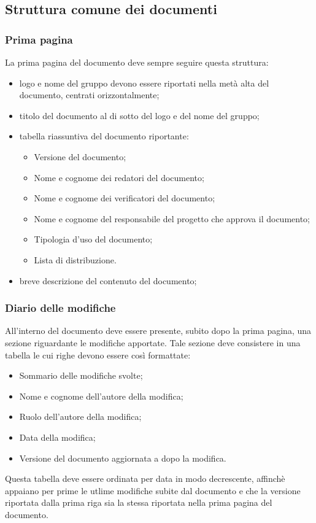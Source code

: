   \subsection{Struttura comune dei documenti}
  \subsubsection{Prima pagina}
  La prima pagina del documento deve sempre seguire questa struttura:
  \begin{itemize}
    \item logo e nome del gruppo devono essere riportati nella metà alta del documento, centrati orizzontalmente;
    \item titolo del documento al di sotto del logo e del nome del gruppo;
    \item tabella riassuntiva del documento riportante:
      \begin{itemize}
      \item Versione del documento;
      \item Nome e cognome dei redatori del documento;
      \item Nome e cognome dei verificatori del documento;
      \item Nome e cognome del responsabile del progetto che approva il documento;
      \item Tipologia d'uso del documento;
      \item Lista di distribuzione.
      \end{itemize}
    \item breve descrizione del contenuto del documento;
  \end{itemize}

  \subsubsection{Diario delle modifiche}
  All'interno del documento deve essere presente, subito dopo la prima pagina, una sezione riguardante le modifiche apportate. Tale sezione deve consistere in una tabella le cui righe devono essere cos\`i formattate:
  \begin{itemize}
  \item Sommario delle modifiche svolte;
  \item Nome e cognome dell'autore della modifica;
  \item Ruolo dell'autore della modifica;
  \item Data della modifica;
  \item Versione del documento aggiornata a dopo la modifica.
  \end{itemize}
  Questa tabella deve essere ordinata per data in modo decrescente, affinch\`e appaiano per prime le utlime modifiche subite dal documento e che la versione riportata dalla prima riga sia la stessa riportata nella prima pagina del documento.


